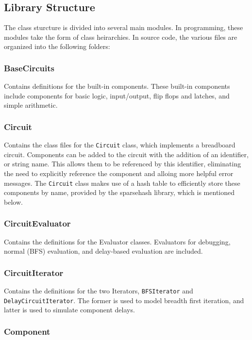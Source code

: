 \documentclass{article}
\newcommand{\ClassName}[1]{\texttt{#1}}
\begin{document}
\subsection{Library Structure}

The class sturcture is divided into several main modules. In programming, these modules take the form of class heirarchies. In source code, the various files are organized into the following folders:

\subsubsection{BaseCircuits}

Contains definitions for the built-in components. These built-in components include components for basic logic, input/output, flip flops and latches, and simple arithmetic.

\subsubsection{Circuit}

Contains the class files for the \ClassName{Circuit} class, which implements a breadboard circuit. Components can be added to the circuit with the addition of an identifier, or string name. This allows them to be referenced by this identifier, eliminating the need to explicitly reference the component and alloing more helpful error messages. The \ClassName{Circuit} class makes use of a hash table to efficiently store these components by name, provided by the sparsehash library, which is mentioned below.

\subsubsection{CircuitEvaluator}

Contains the definitions for the Evaluator classes. Evaluators for debugging, normal (BFS) evaluation, and delay-based evaluation are included.

\subsubsection{CircuitIterator}

Contains the definitions for the two Iterators, \ClassName{BFSIterator} and \ClassName{DelayCircuitIterator}. The former is used to model breadth first iteration, and latter is used to simulate component delays.

\subsubsection{Component}
\end{document}
